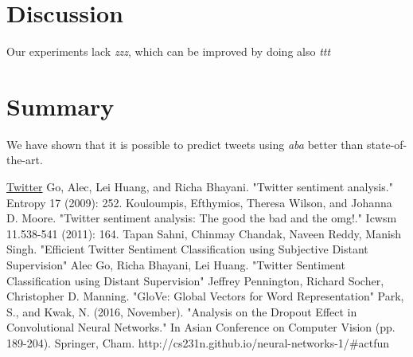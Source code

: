 \documentclass[10pt,conference,compsocconf]{IEEEtran}
\begin{document}
\section{Discussion}
Our experiments lack {\em zzz}, which can be improved by doing also {\em ttt}
\section{Summary}
We have shown that it is possible to predict tweets using {\em aba} better than state-of-the-art.



\begin{thebibliography}{99}

	 \href{http://twitter.com}{Twitter}
	 Go, Alec, Lei Huang, and Richa Bhayani. "Twitter sentiment analysis." Entropy 17 (2009): 252.
	 Kouloumpis, Efthymios, Theresa Wilson, and Johanna D. Moore. "Twitter sentiment analysis: The good the bad and the omg!." Icwsm 11.538-541 (2011): 164.
	 Tapan Sahni, Chinmay Chandak, Naveen Reddy, Manish Singh. "Efficient Twitter Sentiment Classification using Subjective Distant Supervision"
	 Alec Go, Richa Bhayani,	Lei Huang. "Twitter Sentiment Classification using Distant Supervision"
	 Jeffrey Pennington, Richard Socher, Christopher D. Manning. "GloVe: Global Vectors for Word Representation"
	 Park, S., and Kwak, N. (2016, November). "Analysis on the Dropout Effect in Convolutional Neural Networks." In Asian Conference on Computer Vision (pp. 189-204). Springer, Cham.
	 http://cs231n.github.io/neural-networks-1/{\#}actfun
\end{thebibliography}
\end{document}
